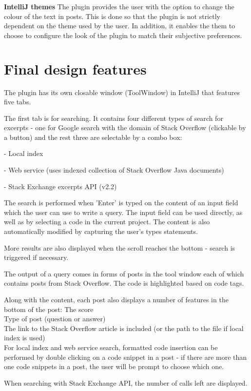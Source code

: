 \documentclass{l4proj}
\begin{document}
\textbf{IntelliJ themes}
The plugin provides the user with the option to change the colour of the text in posts. This is done so that the plugin is not strictly dependent on the theme used by the user. In addition, it enables the them to choose to configure the look of the plugin to match their subjective preferences.

\section{Final design features}
The plugin has its own closable window (ToolWindow) in IntelliJ that features five tabs.

The first tab is for searching. It contains four different types of search for excerpts - one for Google search with the domain of Stack Overflow (clickable by a button) and the rest three are selectable by a combo box:

- Local index

- Web service (uses indexed collection of Stack Overflow Java documents)

- Stack Exchange excerpts API (v2.2)

The search is performed when 'Enter' is typed on the content of an input field which the user can use to write a query. The input field can be used directly, as well as by selecting a code in the current project. The content is also automatically modified by capturing the user's types statements.

More results are also displayed when the scroll reaches the bottom - search is triggered if necessary.

The output of a query comes in forms of posts in the tool window each of
which contains posts from Stack Overflow. The code is highlighted based on code tags.

Along with the content, each post also displays a number of features in the bottom of the post:
The score\\
Type of post (question or answer)\\
The link to the Stack Overflow article is included (or the path to the file if local index is used)\\

For local index and web service search, formatted code insertion can be performed by double clicking on a code snippet in a post - if there are more than one code snippets in a post, the user will be prompt to choose which one.

When searching with Stack Exchange API, the number of calls left are displayed.
\end{document}
